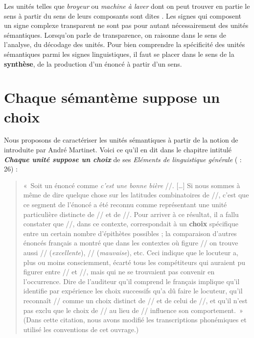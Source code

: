 Les unités telles que \textit{broyeur} ou \textit{machine à laver} dont on peut trouver en partie le sens à partir du sens de leurs composants sont dites . Les signes qui composent un signe complexe transparent ne sont pas pour autant nécessairement des unités sémantiques. Lorsqu’on parle de transparence, on raisonne dans le sens de l’analyse, du décodage des unités. Pour bien comprendre la spécificité des unités sémantiques parmi les signes linguistiques, il faut se placer dans le sens de la \textbf{synthèse}, de la production d’un énoncé à partir d’un sens.

\section{Chaque sémantème suppose un choix}\label{sec:2.3.1}

Nous proposons de caractériser les unités sémantiques à partir de la notion de  introduite par André Martinet. Voici ce qu’il en dit dans le chapitre intitulé \textbf{\textit{Chaque unité suppose un choix}} de ses \textit{Eléments de linguistique générale} (\citeyear{Martinet1960} : 26) :

\begin{quote}
    «~Soit un énoncé comme \textit{c’est une bonne bière} //. […] Si nous sommes à même de dire quelque chose sur les latitudes combinatoires de //, c’est que ce segment de l’énoncé a été reconnu comme représentant une unité particulière distincte de // et de //. Pour arriver à ce résultat, il a fallu constater que //, dans ce contexte, correspondait à un \textbf{choix} spécifique entre un certain nombre d’épithètes possibles ; la comparaison d’autres énoncés français a montré que dans les contextes où figure // on trouve aussi // (\textit{excellente}), // (\textit{mauvaise}), etc. Ceci indique que le locuteur a, plus ou moins consciemment, écarté tous les compétiteurs qui auraient pu figurer entre // et //, mais qui ne se trouvaient pas convenir en l’occurrence. Dire de l’auditeur qu’il comprend le français implique qu’il identifie par expérience les choix successifs qu’a dû faire le locuteur, qu’il reconnaît // comme un choix distinct de // et de celui de //, et qu’il n’est pas exclu que le choix de // au lieu de // influence son comportement.~» (Dans cette citation, nous avons modifié les transcriptions phonémiques et utilisé les conventions de cet ouvrage.)
\end{quote}

